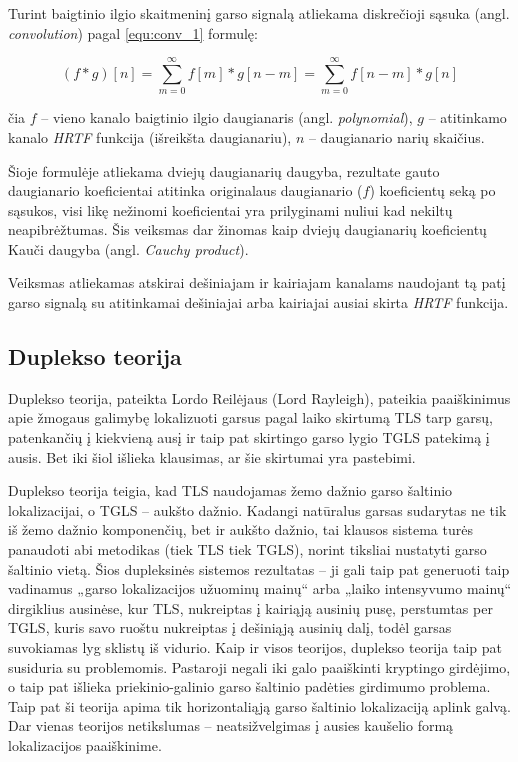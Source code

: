 \documentclass[]{vgtuef}
\begin{document}
Turint baigtinio ilgio skaitmeninį garso signalą atliekama diskrečioji sąsuka (angl. \textit{convolution}) pagal \ref{equ:conv_1} formulę:

\begin{equation}
(f * g)[n] = \sum_{m=0}^{\infty} f[m]*g[n-m]=\sum_{m=0}^{\infty} f[n-m]*g[n]
  \label{equ:conv_1}
\end{equation}

čia $f$ – vieno kanalo baigtinio ilgio daugianaris (angl. \textit{polynomial}), $g$ – atitinkamo kanalo \textit{HRTF} funkcija (išreikšta daugianariu), $n$ – daugianario narių skaičius.

Šioje formulėje atliekama dviejų daugianarių daugyba, rezultate gauto daugianario koeficientai atitinka originalaus daugianario ($f$) koeficientų seką po sąsukos, visi likę nežinomi koeficientai yra prilyginami nuliui kad nekiltų neapibrėžtumas. Šis veiksmas dar žinomas kaip dviejų daugianarių koeficientų Kauči daugyba (angl. \textit{Cauchy product}).

Veiksmas atliekamas atskirai dešiniajam ir kairiajam kanalams naudojant tą patį garso signalą su atitinkamai dešiniajai arba kairiajai ausiai skirta \textit{HRTF} funkcija.

\subsection{Duplekso teorija}

Duplekso teorija, pateikta Lordo Reilėjaus (Lord Rayleigh), pateikia paaiškinimus apie žmogaus galimybę lokalizuoti garsus pagal laiko skirtumą TLS tarp garsų, patenkančių į kiekvieną ausį ir taip pat skirtingo garso lygio TGLS patekimą į ausis. Bet iki šiol išlieka klausimas, ar šie skirtumai yra pastebimi.

Duplekso teorija teigia, kad TLS naudojamas žemo dažnio garso šaltinio lokalizacijai, o TGLS – aukšto dažnio. Kadangi natūralus garsas sudarytas ne tik iš žemo dažnio komponenčių, bet ir aukšto dažnio, tai klausos sistema turės panaudoti abi metodikas (tiek TLS tiek TGLS), norint tiksliai nustatyti garso šaltinio vietą. Šios dupleksinės sistemos rezultatas – ji gali taip pat generuoti taip vadinamus „garso lokalizacijos užuominų mainų“  arba „laiko intensyvumo mainų“ dirgiklius ausinėse, kur TLS, nukreiptas į kairiąją ausinių pusę, perstumtas per TGLS, kuris savo ruoštu nukreiptas į dešiniąją ausinių dalį, todėl garsas suvokiamas lyg sklistų iš vidurio. Kaip ir visos teorijos, duplekso teorija taip pat susiduria su problemomis. Pastaroji negali iki galo paaiškinti kryptingo girdėjimo, o taip pat išlieka priekinio-galinio garso šaltinio padėties girdimumo problema. Taip pat ši teorija apima tik horizontaliąją garso šaltinio lokalizaciją aplink galvą. Dar vienas teorijos netikslumas – neatsižvelgimas į ausies kaušelio formą lokalizacijos paaiškinime.
\end{document}

